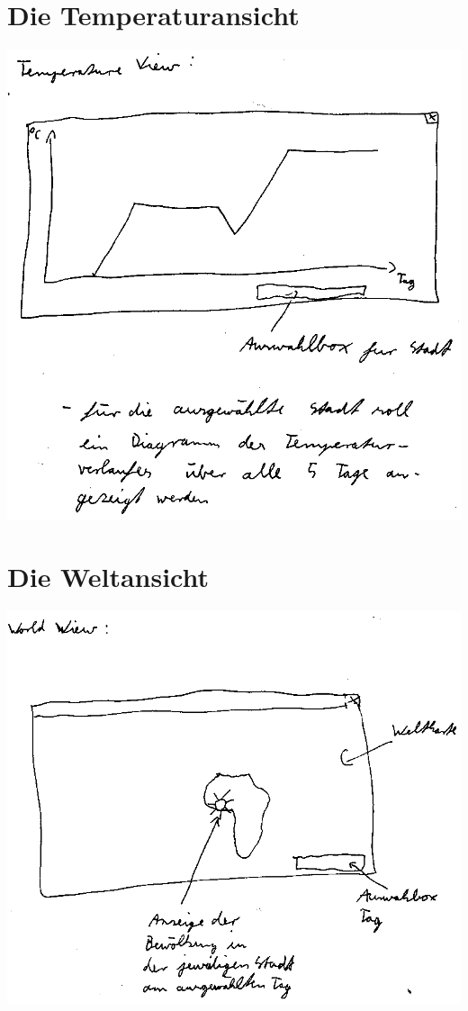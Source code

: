 \documentclass[11pt,a4paper]{scrreprt}
\begin{document}
\section{Die Temperaturansicht}

\begin{center}
\includegraphics[width=14cm]{temperature_view.png}
\end{center}

\section{Die Weltansicht}

\begin{center}
\includegraphics[width=14cm]{world_view.png}
\end{center}
\end{document}
